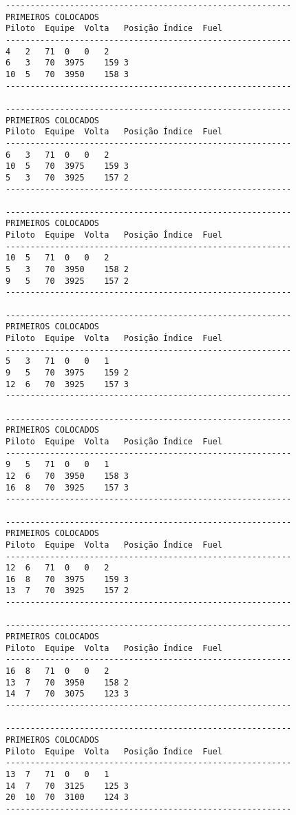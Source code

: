 \documentclass[12pt]{article}
\begin{document}
\begin{verbatim}
----------------------------------------------------------
PRIMEIROS COLOCADOS
Piloto	Equipe	Volta	Posição	Índice	Fuel
----------------------------------------------------------
4	2	71	0	0	2
6	3	70	3975	159	3
10	5	70	3950	158	3
----------------------------------------------------------

----------------------------------------------------------
PRIMEIROS COLOCADOS
Piloto	Equipe	Volta	Posição	Índice	Fuel
----------------------------------------------------------
6	3	71	0	0	2
10	5	70	3975	159	3
5	3	70	3925	157	2
----------------------------------------------------------

----------------------------------------------------------
PRIMEIROS COLOCADOS
Piloto	Equipe	Volta	Posição	Índice	Fuel
----------------------------------------------------------
10	5	71	0	0	2
5	3	70	3950	158	2
9	5	70	3925	157	2
----------------------------------------------------------

----------------------------------------------------------
PRIMEIROS COLOCADOS
Piloto	Equipe	Volta	Posição	Índice	Fuel
----------------------------------------------------------
5	3	71	0	0	1
9	5	70	3975	159	2
12	6	70	3925	157	3
----------------------------------------------------------

----------------------------------------------------------
PRIMEIROS COLOCADOS
Piloto	Equipe	Volta	Posição	Índice	Fuel
----------------------------------------------------------
9	5	71	0	0	1
12	6	70	3950	158	3
16	8	70	3925	157	3
----------------------------------------------------------

----------------------------------------------------------
PRIMEIROS COLOCADOS
Piloto	Equipe	Volta	Posição	Índice	Fuel
----------------------------------------------------------
12	6	71	0	0	2
16	8	70	3975	159	3
13	7	70	3925	157	2
----------------------------------------------------------

----------------------------------------------------------
PRIMEIROS COLOCADOS
Piloto	Equipe	Volta	Posição	Índice	Fuel
----------------------------------------------------------
16	8	71	0	0	2
13	7	70	3950	158	2
14	7	70	3075	123	3
----------------------------------------------------------

----------------------------------------------------------
PRIMEIROS COLOCADOS
Piloto	Equipe	Volta	Posição	Índice	Fuel
----------------------------------------------------------
13	7	71	0	0	1
14	7	70	3125	125	3
20	10	70	3100	124	3
----------------------------------------------------------


\end{verbatim}
\end{document}
